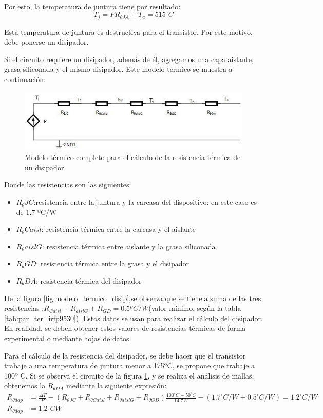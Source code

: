Por esto, la temperatura de juntura tiene por resultado: 
\begin{equation} \label{eq:temp_juntura}
T_j  = P R_{\theta JA}+T_a  = 515^\circ C 
\end{equation}

Esta temperatura de juntura es destructiva para el transistor. Por este motivo, debe ponerse un disipador. 

Si el circuito requiere un disipador, además de él, agregamos una capa aislante, grasa siliconada y el mismo disipador. Este modelo térmico se muestra a continuación:

\begin{figure}[ht!]
	\includegraphics{circuito_termico_2}
	\caption{Modelo térmico completo para el cálculo de la resistencia térmica de un disipador}
	\label{fig:circuito_termico_calc_disip}
\end{figure}

Donde las resistencias son las siguientes: 
\begin{itemize}
	\item ${R_\theta JC} $:resistencia entre la juntura y la carcasa del dispositivo: en este caso es de 1.7 ºC/W  
    \item ${R_\theta Caisl}$: resistencia térmica entre la carcasa y el aislante
    \item ${R_\theta aislG}$: resistencia térmica entre aislante y la grasa siliconada
	\item ${R_\theta GD}$: resistencia térmica entre la grasa y el disipador
	\item ${R_\theta DA}$: resistencia térmica del disipador
\end{itemize}

De la figura \ref{fig:modelo_termico_disip},se observa que se tienela suma de las tres resistencias :$ R_{Caisl}+ R_{aislG}+ R_{GD} = 0.5ºC/W$(valor mínimo, según la tabla \ref{tab:par_ter_irfp9530}). Estos datos se usan para realizar el cálculo del disipador. En realidad, se deben obtener estos valores de resistencias térmicas de forma experimental o mediante hojas de datos.
 
Para el cálculo de la resistencia del disipador, se debe hacer que el transistor trabaje a una temperatura de juntura menor a 175ºC, se propone que trabaje a 100º C. Si se observa el circuito de la figura \ref{fig:circuito_termico_calc_disip}, y se realiza el análisis de mallas, obtenemos la $R_{\theta DA}$ mediante la siguiente expresión:
\begin{align} 
R_{\theta dap}& = \frac{\Delta T}{P} - ( R_{\theta JC}+ R_{\theta Caisl} + R_{\theta aislG} + R_{\theta GD}) \frac{100^\circ C - 50^\circ C }{14.7 W} - (1.7^\circ C/ W + 0.5^\circ C/ W ) = 1.2^\circ C/W \nonumber	\\
R_{\theta dap} &=  1.2^\circ C W \label{eq:val:r_term}
\end{align} 

